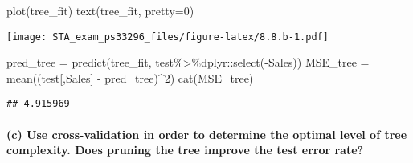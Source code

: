 \documentclass[
]{article}
\newenvironment{Shaded}{\begin{snugshade}}{\end{snugshade}}
\newcommand{\AttributeTok}[1]{\textcolor[rgb]{0.77,0.63,0.00}{#1}}
\newcommand{\DecValTok}[1]{\textcolor[rgb]{0.00,0.00,0.81}{#1}}
\newcommand{\FunctionTok}[1]{\textcolor[rgb]{0.00,0.00,0.00}{#1}}
\newcommand{\NormalTok}[1]{#1}
\newcommand{\OtherTok}[1]{\textcolor[rgb]{0.56,0.35,0.01}{#1}}
\newcommand{\SpecialCharTok}[1]{\textcolor[rgb]{0.00,0.00,0.00}{#1}}
\newcommand{\StringTok}[1]{\textcolor[rgb]{0.31,0.60,0.02}{#1}}
\begin{document}
\begin{Shaded}
\begin{Highlighting}[]
\FunctionTok{plot}\NormalTok{(tree\_fit)}
\FunctionTok{text}\NormalTok{(tree\_fit, }\AttributeTok{pretty=}\DecValTok{0}\NormalTok{)}
\end{Highlighting}
\end{Shaded}

\texttt{[image: STA\_exam\_ps33296\_files/figure-latex/8.8.b-1.pdf]}

\begin{Shaded}
\begin{Highlighting}[]
\NormalTok{pred\_tree }\OtherTok{=} \FunctionTok{predict}\NormalTok{(tree\_fit, test}\SpecialCharTok{\%\textgreater{}\%}\NormalTok{dplyr}\SpecialCharTok{::}\FunctionTok{select}\NormalTok{(}\SpecialCharTok{{-}}\NormalTok{Sales))}
\NormalTok{MSE\_tree }\OtherTok{=} \FunctionTok{mean}\NormalTok{((test[,}\StringTok{\textquotesingle{}Sales\textquotesingle{}}\NormalTok{] }\SpecialCharTok{{-}}\NormalTok{ pred\_tree)}\SpecialCharTok{\^{}}\DecValTok{2}\NormalTok{)}
\FunctionTok{cat}\NormalTok{(MSE\_tree)}
\end{Highlighting}
\end{Shaded}

\begin{verbatim}
## 4.915969
\end{verbatim}

\hypertarget{c-use-cross-validation-in-order-to-determine-the-optimal-level-of-tree-complexity.-does-pruning-the-tree-improve-the-test-error-rate}{%
\paragraph{(c) Use cross-validation in order to determine the optimal
level of tree complexity. Does pruning the tree improve the test error
rate?}\label{c-use-cross-validation-in-order-to-determine-the-optimal-level-of-tree-complexity.-does-pruning-the-tree-improve-the-test-error-rate}}

\begin{Shaded}
\end{Shaded}
\end{document}
